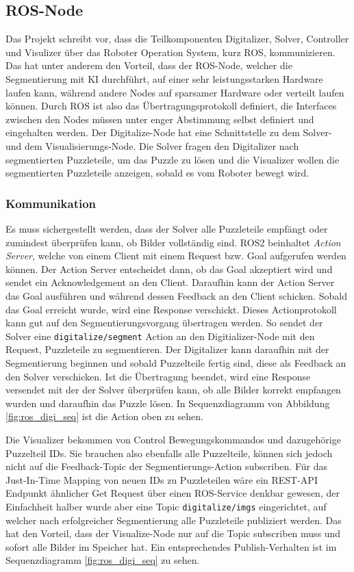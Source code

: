 \subsection[ROS-Node]{ROS-Node }
Das Projekt schreibt vor, dass die Teilkomponenten Digitalizer, Solver, Controller und Visulizer über das Roboter Operation System, kurz ROS, kommunizieren.
Das hat unter anderem den Vorteil, dass der ROS-Node, welcher die Segmentierung mit KI durchführt, auf einer sehr leistungsstarken Hardware laufen kann, während andere Nodes auf sparsamer Hardware oder verteilt laufen können.
Durch ROS ist also das Übertragungsprotokoll definiert, die Interfaces zwischen den Nodes müssen unter enger Abstimmung selbst definiert und eingehalten werden.
Der Digitalize-Node hat eine Schnittstelle zu dem Solver- und dem Visualisierungs-Node.
Die Solver fragen den Digitalizer nach segmentierten Puzzleteile, um das Puzzle zu lösen und die Visualizer wollen die segmentierten Puzzleteile anzeigen, sobald es vom Roboter bewegt wird.

\subsubsection{Kommunikation}
Es muss sichergestellt werden, dass der Solver alle Puzzleteile empfängt oder zumindest überprüfen kann, ob Bilder vollständig sind.
ROS2 beinhaltet \textit{Action Server}, welche von einem Client mit einem Request bzw. Goal aufgerufen werden können.
Der Action Server entscheidet dann, ob das Goal akzeptiert wird und sendet ein Acknowledgement an den Client.
Daraufhin kann der Action Server das Goal ausführen und während dessen Feedback an den Client schicken.
Sobald das Goal erreicht wurde, wird eine Response verschickt.
Dieses Actionprotokoll kann gut auf den Segmentierungsvorgang übertragen werden.
So sendet der Solver eine \verb|digitalize/segment| Action an den Digitializer-Node mit den Request, Puzzleteile zu segmentieren.
Der Digitalizer kann daraufhin mit der Segmentierung beginnen und sobald Puzzelteile fertig sind, diese als Feedback an den Solver verschicken.
Ist die Übertragung beendet, wird eine Response versendet mit der der Solver überprüfen kann, ob alle Bilder korrekt empfangen wurden und daraufhin das Puzzle lösen.
In Sequenzdiagramm von Abbildung \ref{fig:ros_digi_seq} ist die Action oben zu sehen.

Die Visualizer bekommen von Control Bewegungskommandos und dazugehörige Puzzelteil IDs.
Sie brauchen also ebenfalls alle Puzzelteile, können sich jedoch nicht auf die Feedback-Topic der Segmentierungs-Action subscriben.
Für das Just-In-Time Mapping von neuen IDs zu Puzzleteilen wäre ein REST-API Endpunkt ähnlicher Get Request über einen ROS-Service denkbar gewesen, der Einfachheit halber wurde aber eine Topic \verb|digitalize/imgs| eingerichtet, auf welcher nach erfolgreicher Segmentierung alle Puzzleteile publiziert werden.
Das hat den Vorteil, dass der Visualize-Node nur auf die Topic subscriben muss und sofort alle Bilder im Speicher hat.
Ein entsprechendes Publish-Verhalten ist im Sequenzdiagramm \ref{fig:ros_digi_seq} zu sehen.

